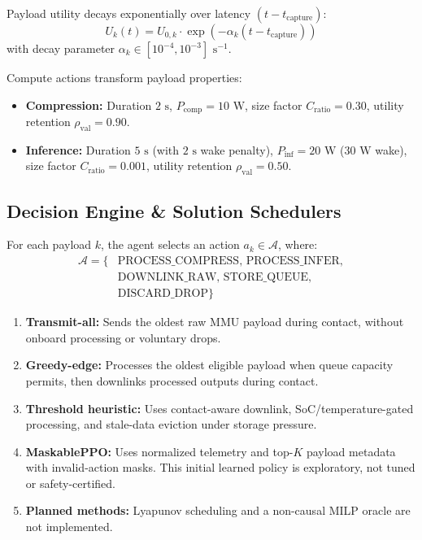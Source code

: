 \documentclass[conference]{IEEEtran}
\begin{document}
Payload utility decays exponentially over latency $(t - t_{\text{capture}})$:
\begin{equation}
U_k(t) = U_{0,k} \cdot \exp\left(-\alpha_k (t - t_{\text{capture}})\right)
\end{equation}
with decay parameter $\alpha_k \in [10^{-4}, 10^{-3}]\text{ s}^{-1}$.

Compute actions transform payload properties:
\begin{itemize}
    \item \textbf{Compression:} Duration $2\text{ s}$, $P_{\text{comp}} = 10\text{ W}$, size factor $C_{\text{ratio}} = 0.30$, utility retention $\rho_{\text{val}} = 0.90$.
    \item \textbf{Inference:} Duration $5\text{ s}$ (with $2\text{ s}$ wake penalty), $P_{\text{inf}} = 20\text{ W}$ ($30\text{ W}$ wake), size factor $C_{\text{ratio}} = 0.001$, utility retention $\rho_{\text{val}} = 0.50$.
\end{itemize}

\subsection{Decision Engine \& Solution Schedulers}
For each payload $k$, the agent selects an action $a_k \in \mathcal{A}$, where:
\begin{align}
\mathcal{A} = \{&\text{PROCESS\_COMPRESS},\, \text{PROCESS\_INFER}, \nonumber \\
                &\text{DOWNLINK\_RAW},\, \text{STORE\_QUEUE}, \nonumber \\
                &\text{DISCARD\_DROP}\}
\end{align}
\begin{enumerate}
    \item \textbf{Transmit-all:} Sends the oldest raw MMU payload during contact, without onboard processing or voluntary drops.
    \item \textbf{Greedy-edge:} Processes the oldest eligible payload when queue capacity permits, then downlinks processed outputs during contact.
    \item \textbf{Threshold heuristic:} Uses contact-aware downlink, SoC/temperature-gated processing, and stale-data eviction under storage pressure.
    \item \textbf{MaskablePPO:} Uses normalized telemetry and top-$K$ payload metadata with invalid-action masks. This initial learned policy is exploratory, not tuned or safety-certified.
    \item \textbf{Planned methods:} Lyapunov scheduling and a non-causal MILP oracle are not implemented.
\end{enumerate}
\end{document}
